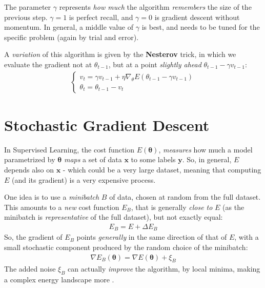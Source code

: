 \documentclass[../template.tex]{subfiles}
\begin{document}
The parameter $\gamma$ represents \textit{how much} the algorithm \textit{remembers} the size of the previous step. $\gamma=1$ is perfect recall, and $\gamma=0$ is gradient descent without momentum. In general, a middle value of $\gamma$ is best, and needs to be tuned for the specific problem (again by trial and error).

\medskip

A \textit{variation} of this algorithm is given by the \textbf{Nesterov} trick, in which we evaluate the gradient not at $\theta_{t-1}$, but at a point \textit{slightly ahead} $\theta_{t-1} - \gamma v_{t-1}$:
\begin{align*}
    \begin{cases}
        v_t = \gamma v_{t-1} + \eta \nabla_\theta E(\theta_{t-1} - \gamma v_{t-1})\\
        \theta_{t} = \theta_{t-1} - v_t
    \end{cases}
\end{align*} 

\section{Stochastic Gradient Descent}
In Supervised Learning, the cost function $E(\bm{\theta})$, \textit{measures} how much a model parametrized by $\bm{\theta}$ \textit{maps } a set of data $\bm{x}$ to some labels $\bm{y}$. So, in general, $E$ depends also on $\bm{x}$ - which could be a very large dataset, meaning that computing $E$ (and its gradient) is a very expensive process.

\medskip

One idea is to use a \textit{minibatch} $B$ of data, chosen at random from the full dataset. This amounts to a \textit{new} cost function $E_B$, that is generally \textit{close to} $E$ (as the minibatch is \textit{representative} of the full dataset), but not exactly equal:
\begin{align*}
    E_B = E + \Delta E_B
\end{align*}  
So, the gradient of $E_B$ points \textit{generally} in the same direction of that of $E$, with a small stochastic component produced by the random choice of the minibatch:
\begin{align*}
    \nabla E_B(\bm{\theta}) = \nabla E(\bm{\theta}) + \xi_B
\end{align*} 
The added noise $\xi_B$ can actually \textit{improve} the algorithm, by  local minima, making a complex  energy landscape more .
\end{document}
